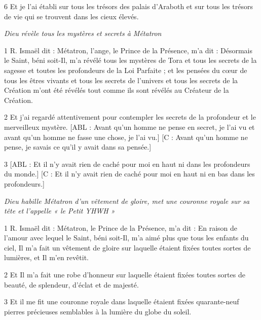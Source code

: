 \par 6 Et je l'ai établi sur tous les trésors des palais d'Araboth et sur tous les trésors de vie qui se trouvent dans les cieux élevés.


\par \textit{Dieu révèle tous les mystères et secrets à Métatron}

\par 1 R. Ismaël dit : Métatron, l'ange, le Prince de la Présence, m'a dit : Désormais le Saint, béni soit-Il, m'a révélé tous les mystères de Tora et tous les secrets de la sagesse et toutes les profondeurs de la Loi Parfaite ; et les pensées du cœur de tous les êtres vivants et tous les secrets de l'univers et tous les secrets de la Création m'ont été révélés tout comme ils sont révélés au Créateur de la Création.

\par 2 Et j'ai regardé attentivement pour contempler les secrets de la profondeur et le merveilleux mystère. [ABL : Avant qu'un homme ne pense en secret, je l'ai vu et avant qu'un homme ne fasse une chose, je l'ai vu.] [C : Avant qu'un homme ne pense, je savais ce qu'il y avait dans sa pensée.]

\par 3 [ABL : Et il n’y avait rien de caché pour moi en haut ni dans les profondeurs du monde.] [C : Et il n’y avait rien de caché pour moi en haut ni en bas dans les profondeurs.]


\par \textit{Dieu habille Métatron d'un vêtement de gloire, met une couronne royale sur sa tête et l'appelle « le Petit YHWH »}

\par 1 R. Ismaël dit : Métatron, le Prince de la Présence, m'a dit : En raison de l'amour avec lequel le Saint, béni soit-Il, m'a aimé plus que tous les enfants du ciel, Il m'a fait un vêtement de gloire sur laquelle étaient fixées toutes sortes de lumières, et Il m'en revêtit.

\par 2 Et Il m'a fait une robe d'honneur sur laquelle étaient fixées toutes sortes de beauté, de splendeur, d'éclat et de majesté.

\par 3 Et il me fit une couronne royale dans laquelle étaient fixées quarante-neuf pierres précieuses semblables à la lumière du globe du soleil.

